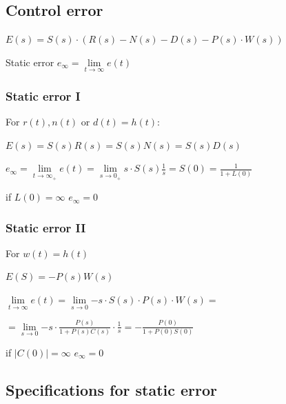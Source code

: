 \documentclass[10pt,a4paper]{scrartcl}
\begin{document}
\begin{multicols*}{3}
	
	
	\subsection*{Control error}
	
	
	$E(s)=S(s)\cdot\left(R(s)-N(s)-D(s)-P(s)\cdot W(s)\right)$
	
	Static error $e_\infty=\lim\limits_{t\rightarrow\infty}{e(t)}$
	
	
	
	\subsubsection{Static error I}
	
	For $r(t), n(t)$ or $d(t) = h(t)$:
	
	$E(s)=S(s)R(s)=S(s)N(s)=S(s)D(s)$
	
	
	$e_\infty=\lim\limits_{t\rightarrow\infty_+}{e(t)}=\lim\limits_{s\rightarrow 0_+}{s\cdot S(s)\frac{1}{s}}=S(0)=\frac{1}{1+L(0)}$
	
	\dahe if $L(0)=\infty$ \dahe $e_\infty = 0$
	
	
	\columnbreak
	
	\subsubsection{Static error II}
	
	For $w(t) = h(t)$
	
	$E(S)=-P(s)W(s)$
	
	\finn
	
	$\lim\limits_{t\rightarrow\infty}{e(t)}=\lim\limits_{s\rightarrow 0}{-s\cdot S(s)\cdot P(s)\cdot W(s)}=$
	
	$=\lim\limits_{s\rightarrow 0}{-s\cdot\frac{P(s)}{1+P(s)C(s)}\cdot\frac{1}{s}=-\frac{P(0)}{1+P(0)S(0)}}$
	
	\finn	
	
	\dahe if $|C(0)|=\infty$ \dahe $e_\infty=0$
	
	
	
	
	\subsection*{Specifications for static error}
	

\end{multicols*}
\end{document}
